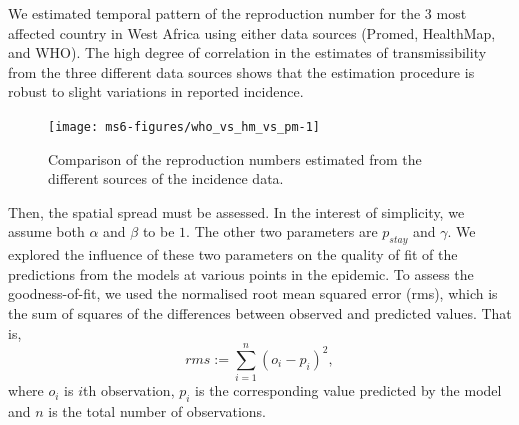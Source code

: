 \documentclass[11pt,]{article}
\begin{document}
We estimated temporal pattern of the reproduction number for the 3 most affected country in West Africa
using either data sources (Promed, HealthMap, and WHO).
The high degree of correlation in the estimates of transmissibility from the three
different data sources shows that the estimation procedure is robust
to slight variations in reported incidence.

\begin{figure}
  \centering
  \texttt{[image: ms6-figures/who\_vs\_hm\_vs\_pm-1]}
  \caption{Comparison of the reproduction numbers estimated from
        the different sources of the incidence data.}
  \label{fig:r_comp}
\end{figure}

\FloatBarrier
Then, the spatial spread must be assessed.
In the interest of simplicity, we assume both
$\alpha$ and $\beta$ to be $1$. The other two parameters are
$p_{stay}$ and $\gamma$. We explored the influence of these two
parameters on the quality of fit of the predictions from the models at various points in the
epidemic. To assess the goodness-of-fit, we used the normalised root mean squared
error (rms), which is the sum of squares of the differences between
observed and predicted values. That is, 
\[ rms := \sum_{i = 1}^n{\left(o_i - p_i\right)^2},\]
where $o_i$ is $i$th observation, $p_i$ is the corresponding value
predicted by the model and $n$ is the total number of observations.
\end{document}
